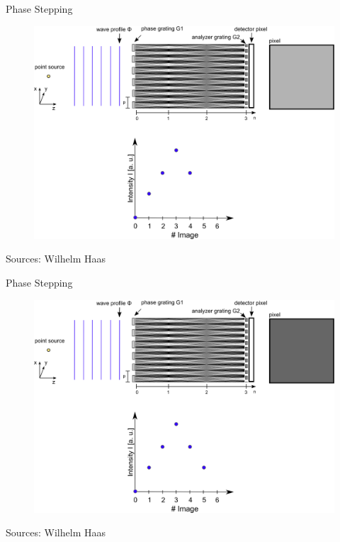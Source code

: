 \begin{frame}{Phase Stepping}
    \vspace{-0.5cm}
    \begin{figure}
        \includegraphics[height=0.92\textheight]{images/phase5.eps}
    \end{figure}
    \begin{flushright}
        \scriptsize Sources: Wilhelm Haas
    \end{flushright}
\end{frame}

\begin{frame}{Phase Stepping}
    \vspace{-0.5cm}
    \begin{figure}
        \includegraphics[height=0.92\textheight]{images/phase6.eps}
    \end{figure}
    \begin{flushright}
        \scriptsize Sources: Wilhelm Haas
    \end{flushright}
\end{frame}

